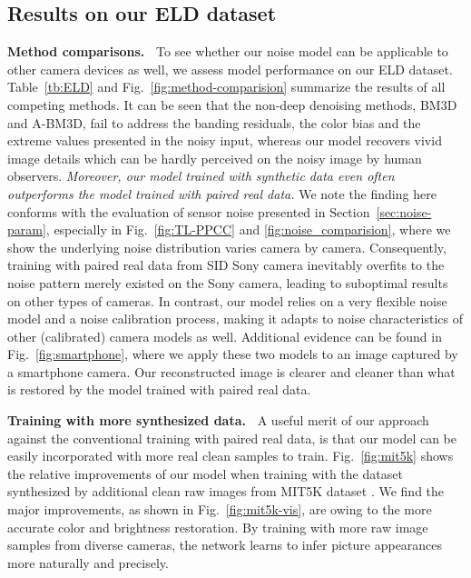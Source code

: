 \documentclass[10pt,twocolumn,letterpaper]{article}
\begin{document}
\subsection{Results on our ELD dataset}
\noindent\textbf{Method comparisons.~}
To see whether our noise model can be applicable to other camera devices as
well, we assess model performance on our ELD dataset.
Table~\ref{tb:ELD} and Fig.~\ref{fig:method-comparision} summarize the
results of all competing methods.  
It can be seen that the non-deep denoising methods, \ie BM3D and A-BM3D, fail to address the banding residuals, the color bias and the extreme values presented in the noisy input,  whereas our model recovers vivid image details which can be hardly perceived on the noisy image by human observers.
\textit{Moreover, our model trained with synthetic data even often outperforms the model trained with paired real data.} 
We note the finding here conforms with the evaluation of sensor noise presented in Section~\ref{sec:noise-param}, especially in Fig.~\ref{fig:TL-PPCC} and \ref{fig:noise_comparision}, where we show the underlying noise distribution varies camera by camera. 
Consequently, training with paired real data from SID Sony camera inevitably overfits to the noise pattern merely existed on the Sony camera, 
leading to suboptimal results on other types of cameras.  In contrast, our model relies on a very flexible noise model and a noise calibration process,  making it adapts to noise characteristics of other (calibrated) camera models as well.  Additional evidence can be found in Fig.~\ref{fig:smartphone}, where we apply these two models to an image captured by a smartphone camera. 
Our reconstructed image is clearer and cleaner than what is restored by the model trained with paired real data.  

\vspace{3pt}
\noindent\textbf{Training with more synthesized data.~}
A useful merit of our approach against the conventional training with paired
real data, is that our model can be easily incorporated with more real clean
samples to train. Fig.~\ref{fig:mit5k} shows the relative improvements of our
model when training with the dataset synthesized by additional clean raw images from MIT5K dataset \cite{fivek}. We find the major improvements, as shown in Fig.~\ref{fig:mit5k-vis}, are owing to the more accurate color and brightness restoration. By training with more raw image samples from diverse cameras, the network learns to infer picture appearances more naturally and precisely. 
\end{document}
